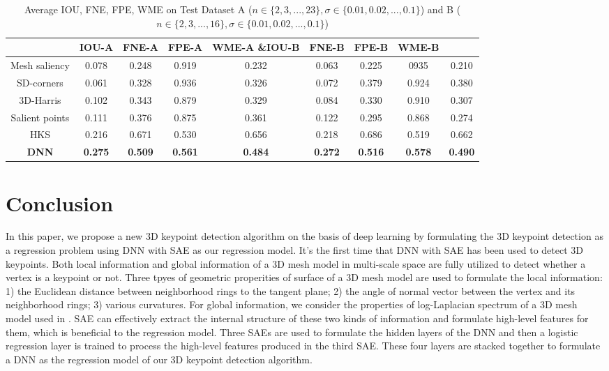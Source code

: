 \documentclass[runningheads]{article}
\begin{document}
\begin{table}[!htb]
	\centering
	\renewcommand\arraystretch{1.2}
	\caption{Average IOU, FNE, FPE, WME on Test Dataset A (\emph{$n \in \{2,3,...,23\}, \sigma \in \{0.01,0.02,...,0.1\}$}) and B (\emph{$n \in \{2,3,...,16\}, \sigma \in \{0.01,0.02,...,0.1\}$})}
	\begin{tabular}{ccccccccc}  
		\hline
		\cline{1-9}
		&IOU-A  &FNE-A  &FPE-A  &WME-A               \&IOU-B &FNE-B &FPE-B &WME-B \\ \hline
		Mesh saliency &0.078 &0.248 &0.919 &0.232                &0.063 &0.225 &0935 &0.210\\
		SD-corners &0.061 &0.328 &0.936 &0.326                   &0.072 &0.379 &0.924 &0.380\\
		3D-Harris &0.102 &0.343 &0.879 &0.329                    &0.084 &0.330 &0.910 &0.307\\
		Salient points &0.111 &0.376 &0.875 &0.361               &0.122 &0.295 &0.868 &0.274\\
		HKS &0.216 &0.671 &0.530 &0.656                          &0.218 &0.686 &0.519 &0.662\\
		\textbf{DNN} &\textbf{0.275} &\textbf{0.509} &\textbf{0.561} &\textbf{0.484}                          &\textbf{0.272} &\textbf{0.516} &\textbf{0.578} &\textbf{0.490}\\
		\hline
		\cline{1-9}
	\end{tabular}
\end{table}

\section{Conclusion}
In this paper, we propose a new 3D keypoint detection algorithm on the basis of deep learning by formulating the 3D keypoint detection as a regression problem using DNN with SAE as our regression model. It's the first time that DNN with SAE has been used to detect 3D keypoints. Both local information and global information of a 3D mesh model in multi-scale space are fully utilized to detect whether a vertex is a keypoint or not. Three tpyes of geometric properities of surface of a 3D mesh model are used to formulate the local information: 1) the Euclidean distance between neighborhood rings to the tangent plane; 2) the angle of normal vector between the vertex and its neighborhood rings; 3) various curvatures. For global information, we consider the properties of log-Laplacian spectrum of a 3D mesh model used in \cite{song2014mesh}. SAE can effectively extract the internal structure of these two kinds of information and formulate high-level features for them, which is beneficial to the regression model. Three SAEs are used to formulate the hidden layers of the DNN and then a logistic regression layer is trained to process the high-level features produced in the third SAE. These four layers are stacked together to formulate a DNN as the regression model of our 3D keypoint detection algorithm.
\end{document}
